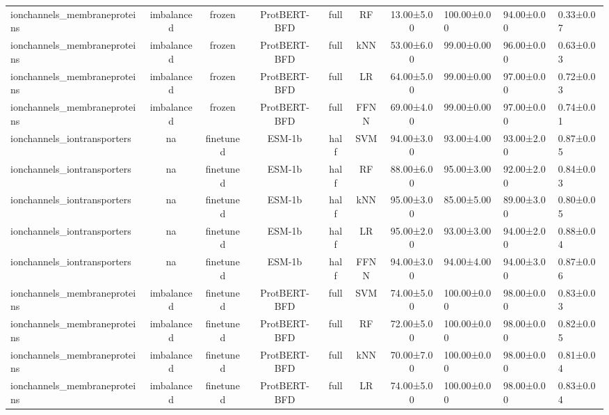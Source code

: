 \begin{tabular}{lcccccc}
    ionchannels\_membraneproteins & imbalanced &         frozen & ProtBERT-BFD &      full &         RF &  13.00±5.00 & 100.00±0.00 &  94.00±0.00 & 0.33±0.07 \\
    ionchannels\_membraneproteins & imbalanced &         frozen & ProtBERT-BFD &      full &        kNN &  53.00±6.00 &  99.00±0.00 &  96.00±0.00 & 0.63±0.03 \\
    ionchannels\_membraneproteins & imbalanced &         frozen & ProtBERT-BFD &      full &         LR &  64.00±5.00 &  99.00±0.00 &  97.00±0.00 & 0.72±0.03 \\
    ionchannels\_membraneproteins & imbalanced &         frozen & ProtBERT-BFD &      full &       FFNN &  69.00±4.00 &  99.00±0.00 &  97.00±0.00 & 0.74±0.01 \\
     ionchannels\_iontransporters &         na &      finetuned &       ESM-1b &      half &        SVM &  94.00±3.00 &  93.00±4.00 &  93.00±2.00 & 0.87±0.05 \\
     ionchannels\_iontransporters &         na &      finetuned &       ESM-1b &      half &         RF &  88.00±6.00 &  95.00±3.00 &  92.00±2.00 & 0.84±0.03 \\
     ionchannels\_iontransporters &         na &      finetuned &       ESM-1b &      half &        kNN &  95.00±3.00 &  85.00±5.00 &  89.00±3.00 & 0.80±0.05 \\
     ionchannels\_iontransporters &         na &      finetuned &       ESM-1b &      half &         LR &  95.00±2.00 &  93.00±3.00 &  94.00±2.00 & 0.88±0.04 \\
     ionchannels\_iontransporters &         na &      finetuned &       ESM-1b &      half &       FFNN &  94.00±3.00 &  94.00±4.00 &  94.00±3.00 & 0.87±0.06 \\
    ionchannels\_membraneproteins & imbalanced &      finetuned & ProtBERT-BFD &      full &        SVM &  74.00±5.00 & 100.00±0.00 &  98.00±0.00 & 0.83±0.03 \\
    ionchannels\_membraneproteins & imbalanced &      finetuned & ProtBERT-BFD &      full &         RF &  72.00±5.00 & 100.00±0.00 &  98.00±0.00 & 0.82±0.05 \\
    ionchannels\_membraneproteins & imbalanced &      finetuned & ProtBERT-BFD &      full &        kNN &  70.00±7.00 & 100.00±0.00 &  98.00±0.00 & 0.81±0.04 \\
    ionchannels\_membraneproteins & imbalanced &      finetuned & ProtBERT-BFD &      full &         LR &  74.00±5.00 & 100.00±0.00 &  98.00±0.00 & 0.83±0.04 \\

\end{tabular}
